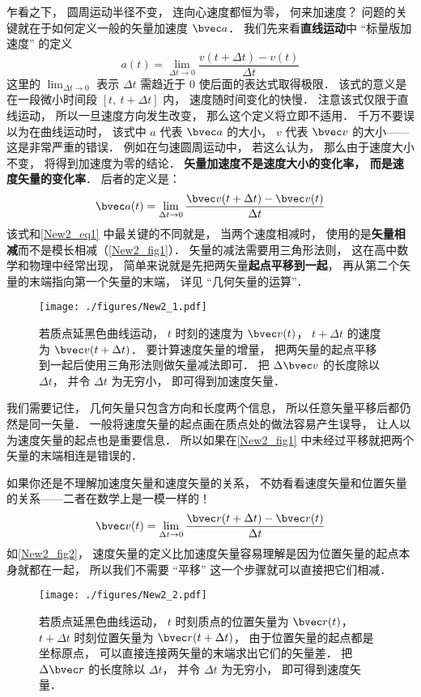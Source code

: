 乍看之下， 圆周运动半径不变， 连向心速度都恒为零， 何来加速度？ 问题的关键就在于如何定义一般的矢量加速度 $\bvec a$． 我们先来看\textbf{直线运动}中 “标量版加速度” 的定义
\begin{equation}\label{New2_eq1}
a(t) = \lim_{\Delta t\to 0}\frac{v(t+\Delta t) - v(t)}{\Delta t}
\end{equation}
这里的 $\lim_{\Delta t\to 0}$ 表示 $\Delta t$ 需趋近于 0 使后面的表达式取得极限． 该式的意义是在一段微小时间段 $[t,\ t+\Delta t]$ 内， 速度随时间变化的快慢． 注意该式仅限于直线运动， 所以一旦速度方向发生改变， 那么这个定义将立即不适用． 千万不要误以为在曲线运动时， 该式中 $a$ 代表 $\bvec a$ 的大小， $v$ 代表 $\bvec v$ 的大小——这是非常严重的错误． 例如在匀速圆周运动中， 若这么认为， 那么由于速度大小不变， 将得到加速度为零的结论． \textbf{矢量加速度不是速度大小的变化率， 而是速度矢量的变化率}． 后者的定义是：
\begin{equation}\label{New2_eq2}
\bvec a(t) = \lim_{\Delta t\to 0}\frac{\bvec v(t+\Delta t) - \bvec v(t)}{\Delta t}
\end{equation}
该式和\autoref{New2_eq1} 中最关键的不同就是， 当两个速度相减时， 使用的是\textbf{矢量相减}而不是模长相减（\autoref{New2_fig1}）． 矢量的减法需要用三角形法则， 这在高中数学和物理中经常出现， 简单来说就是先把两矢量\textbf{起点平移到一起}， 再从第二个矢量的末端指向第一个矢量的末端， 详见 “几何矢量的运算”．

\begin{figure}[ht]
\centering
\texttt{[image: ./figures/New2\_1.pdf]}
\caption{若质点延黑色曲线运动， $t$ 时刻的速度为 $\bvec v(t)$， $t+\Delta t$ 的速度为 $\bvec v(t+\Delta t)$． 要计算速度矢量的增量， 把两矢量的起点平移到一起后使用三角形法则做矢量减法即可． 把 $\Delta \bvec v$ 的长度除以 $\Delta t$， 并令 $\Delta t$ 为无穷小， 即可得到加速度矢量．} \label{New2_fig1}
\end{figure}

我们需要记住， 几何矢量只包含方向和长度两个信息， 所以任意矢量平移后都仍然是同一矢量． 一般将速度矢量的起点画在质点处的做法容易产生误导， 让人以为速度矢量的起点也是重要信息． 所以如果在\autoref{New2_fig1} 中未经过平移就把两个矢量的末端相连是错误的．

如果你还是不理解加速度矢量和速度矢量的关系， 不妨看看速度矢量和位置矢量的关系——二者在数学上是一模一样的！
\begin{equation}
\bvec v(t) = \lim_{\Delta t\to 0}\frac{\bvec r(t+\Delta t) - \bvec r(t)}{\Delta t}
\end{equation}
如\autoref{New2_fig2}， 速度矢量的定义比加速度矢量容易理解是因为位置矢量的起点本身就都在一起， 所以我们不需要 “平移” 这一个步骤就可以直接把它们相减．
\begin{figure}[ht]
\centering
\texttt{[image: ./figures/New2\_2.pdf]}
\caption{若质点延黑色曲线运动， $t$ 时刻质点的位置矢量为 $\bvec r(t)$，$t+\Delta t$ 时刻位置矢量为 $\bvec r(t+\Delta t)$， 由于位置矢量的起点都是坐标原点， 可以直接连接两矢量的末端求出它们的矢量差． 把 $\Delta \bvec r$ 的长度除以 $\Delta t$， 并令 $\Delta t$ 为无穷小， 即可得到速度矢量．} \label{New2_fig2}
\end{figure}


